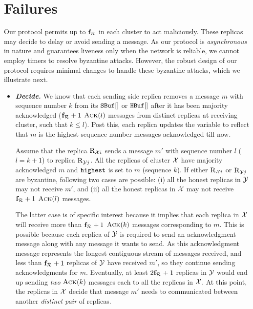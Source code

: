 \section{Failures}
Our \Shadow{} protocol permits up to $\textbf{f}_{\mathcal{R}_{\mathcal{}}}$ in each cluster to act maliciously.
These replicas may decide to delay or avoid sending a message. 
As our \Shadow{} protocol is {\em asynchronous} in nature and guarantees liveness only when the network is reliable, 
we cannot employ timers to resolve byzantine attacks.
However, the robust design of our \Shadow{} protocol requires minimal changes to handle these byzantine attacks, 
which we illustrate next.

\begin{itemize}[wide]
\item {\bf \em Decide.}
We know that each sending side replica removes a message $m$ with sequence number $k$ from its $\texttt{SBuf}[{}]$ or $\texttt{HBuf}[{}]$ 
after it has been majority acknowledged ($\textbf{f}_{\mathcal{R}_{\mathcal{}}}+1$ $\textsc{Ack}(l)$ messages from distinct replicas at receiving cluster, such that $k \le l$).
Post this, each replica updates the \highest{} variable to reflect that $m$ is the highest sequence number messages acknowledged till now.

Assume that the replica $\textsc{R}_{{\mathcal{X}}{i}}$ sends a message $m'$ with sequence number $l$ ($l = k+1$) to replica $\textsc{R}_{{\mathcal{Y}}{j}}$.
All the replicas of cluster $\mathcal{X}$ have majority acknowledged $m$ and $\texttt{highest}$ is set to $m$ (sequence $k$).
If either $\textsc{R}_{{\mathcal{X}}{i}}$ or $\textsc{R}_{{\mathcal{Y}}{j}}$ are byzantine, following two cases are possible:
(i) all the honest replicas in $\mathcal{Y}$ may not receive $m'$, and 
(ii) all the honest replicas in $\mathcal{X}$ may not receive $\textbf{f}_{\mathcal{R}_{\mathcal{}}}+1$ $\textsc{Ack}(l)$ messages.

The latter case is of specific interest because it implies that 
each replica in $\mathcal{X}$ will receive more than $\textbf{f}_{\mathcal{R}_{\mathcal{}}}+1$ $\textsc{Ack}(k)$ messages corresponding to $m$.
This is possible because each replica of $\mathcal{Y}$ is required to send an acknowledgment message along with any message it wants to send. 
As this acknowledgment message represents the longest contiguous stream of messages received, and 
less than $\textbf{f}_{\mathcal{R}_{\mathcal{}}}+1$ replicas of $\mathcal{Y}$ have received $m'$, so they continue sending acknowledgments for $m$.
Eventually, at least $2\textbf{f}_{\mathcal{R}_{\mathcal{}}}+1$ replicas in $\mathcal{Y}$ would end up sending 
{\em two} $\textsc{Ack}(k)$ messages each to all the replicas in $\mathcal{X}$.
At this point, the replicas in $\mathcal{X}$ decide that message $m'$ needs to communicated between another {\em distinct pair} of replicas.



\end{itemize}
